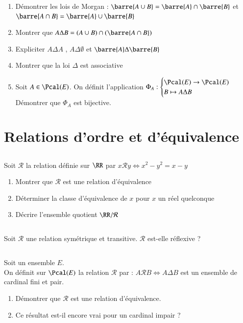 \documentclass[oneside,12pt]{article}
\begin{document}
\begin{enumerate}
	\item Démontrer les lois de Morgan : $\barre{A \cup B}=\barre{A}\cap\barre{B}$ \quad et \quad $\barre{A \cap B}=\barre{A}\cup\barre{B}$
	\item Montrer que $A\Delta B = (A \cup B) \cap (\barre{A\cap B})$
	\item Expliciter $A \Delta A$ , $A\Delta\emptyset$ et $\barre{A}\Delta\barre{B}$
	\item Montrer que la loi $\Delta$ est associative
	\item Soit $A\in\Pcal(E)$. \quad On définit l'application $\Phi_A : \begin{cases} \Pcal(E)\to\Pcal(E) \\ B \mapsto A \Delta B \end{cases}$ \\
	Démontrer que $\Phi_A$ est bijective.
\end{enumerate}


\section{Relations d'ordre et d'équivalence}

\subsection{}
Soit $\mathcal{R}$ la relation définie sur $\RR$ par $x\mathcal{R}y \Leftrightarrow x^2-y^2=x-y$
\begin{enumerate}
	\item Montrer que $\mathcal{R}$ est une relation d'équivalence
	\item Déterminer la classe d'équivalence de $x$ pour $x$ un réel quelconque
	\item Décrire l'ensemble quotient $\RR / \mathcal{R}$
\end{enumerate}

\subsection{}
Soit $\mathcal{R}$ une relation symétrique et transitive. $\mathcal{R}$ est-elle réflexive ?

\subsection{}
Soit un ensemble $E$.\\
On définit sur $\Pcal(E)$ la relation $\mathcal{R}$ par : $A \mathcal{R} B \Leftrightarrow A \Delta B$ est un ensemble de cardinal fini et pair.
\begin{enumerate}
	\item Démontrer que $\mathcal{R}$ est une relation d'équivalence.
	\item Ce résultat est-il encore vrai pour un cardinal impair ?
\end{enumerate}
\end{document}
